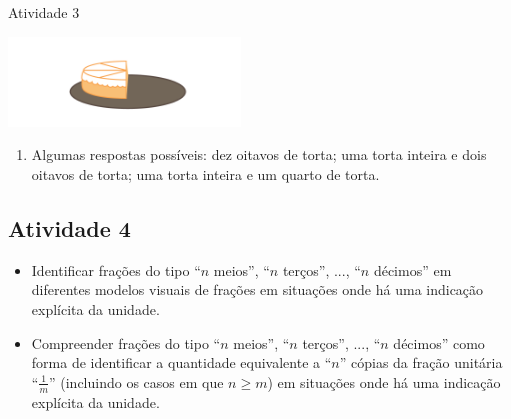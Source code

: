\begin{multicols}{2}
\begin{resposta*}{Atividade 3}
  \begin{center}
  \includegraphics[width=175pt, keepaspectratio]{../figuras/licao02/ativ3_resposta.png}
  \end{center}

\begin{enumerate} [\quad a)] %
    \item       Algumas respostas possíveis: dez oitavos de torta;  uma torta inteira e dois oitavos de torta; uma torta inteira e um quarto de torta.
\end{enumerate} %

\end{resposta*}



\subsection{Atividade 4}

   \vspace{.1cm}

\begin{itemize} %
    \item       Identificar frações do tipo       ``$n$ meios'',       ``$n$ terços'', ...,       ``$n$ décimos''     em diferentes modelos visuais de frações em situações onde há uma indicação explícita da unidade.
    \item       Compreender frações do tipo       ``$n$ meios'',       ``$n$ terços'', ...,       ``$n$ décimos''     como forma de identificar a quantidade equivalente a ``$n$''     cópias da fração unitária       ``$\frac{1}{m}$''     (incluindo os casos em que $n \geq m$) em situações onde há uma indicação explícita da unidade.
\end{itemize} %


  \vspace{.1cm}

  \vspace{.1cm}


\end{multicols}
